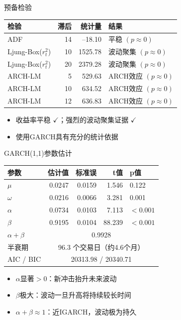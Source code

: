 \documentclass[10pt,aspectratio=169]{beamer}
\begin{document}
\begin{frame}{预备检验}
  \begin{table}
    \centering
    \begin{tabular}{lrrl}
      \toprule
      检验 & 滞后 & 统计量 & 结果 \\
      \midrule
      ADF & 14 & --18.10 & 平稳 $(p\approx 0)$ \\
      Ljung-Box($r_t^2$) & 10 & 1525.78 & 波动聚集 $(p\approx 0)$ \\
      Ljung-Box($r_t^2$) & 20 & 2379.28 & 波动聚集 $(p\approx 0)$ \\
      ARCH-LM & 5 & 529.63 & ARCH效应 $(p\approx 0)$ \\
      ARCH-LM & 10 & 634.52 & ARCH效应 $(p\approx 0)$ \\
      ARCH-LM & 12 & 636.83 & ARCH效应 $(p\approx 0)$ \\
      \bottomrule
    \end{tabular}
  \end{table}
  \begin{itemize}
    \item 收益率平稳 $\checkmark$；强烈的波动聚集证据 $\checkmark$\\
    \item 使用GARCH具有充分的统计依据
  \end{itemize}
\end{frame}

\begin{frame}{GARCH(1,1)参数估计}
  \begin{table}
    \centering
    \begin{tabular}{lrrrl}
      \toprule
      参数 & 估计值 & 标准误 & t值 & p值 \\
      \midrule
      $\mu$ & 0.0247 & 0.0159 & 1.546 & 0.122 \\
      $\omega$ & 0.0216 & 0.0066 & 3.281 & 0.001 \\
      $\alpha$ & 0.0734 & 0.0103 & 7.113 & $<0.001$ \\
      $\beta$ & 0.9195 & 0.0104 & 88.239 & $<0.001$ \\
      \midrule
      $\alpha+\beta$ & \multicolumn{4}{c}{0.9928} \\
      半衰期 & \multicolumn{4}{c}{96.3 个交易日（约4.6个月）} \\
      AIC / BIC & \multicolumn{4}{c}{20313.98 / 20340.71} \\
      \bottomrule
    \end{tabular}
  \end{table}
  \begin{itemize}
    \item $\alpha$显著$>0$：新冲击抬升未来波动
    \item $\beta$极大：波动一旦升高将持续较长时间
    \item $\alpha+\beta\approx1$：近IGARCH，波动极为持久
  \end{itemize}
\end{frame}
\end{document}
